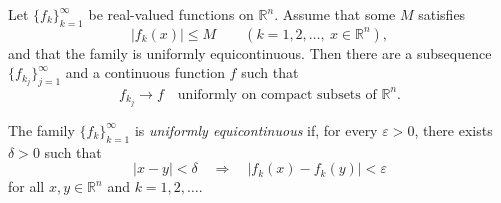 \begin{theorem}
\label{thm:arzela-ascoli-theorem}
Let $\{f_k\}_{k=1}^\infty$ be real-valued functions on $\mathbb R^n$. Assume that some $M$ satisfies
\[
|f_k(x)|\leq M
\qquad(k=1,2,\ldots,\ x\in\mathbb R^n),
\]
and that the family is uniformly equicontinuous. Then there are a subsequence $\{f_{k_j}\}_{j=1}^\infty$ and a continuous function $f$ such that
\[
f_{k_j}\to f
\quad\text{uniformly on compact subsets of }\mathbb R^n.
\]
\end{theorem}

\begin{definition}
\label{def:uniform-equicontinuity}
The family $\{f_k\}_{k=1}^\infty$ is \textit{uniformly equicontinuous} if, for every $\varepsilon>0$, there exists $\delta>0$ such that
\[
|x-y|<\delta
\quad\Longrightarrow\quad
|f_k(x)-f_k(y)|<\varepsilon
\]
for all $x,y\in\mathbb R^n$ and $k=1,2,\ldots$.
\end{definition}
